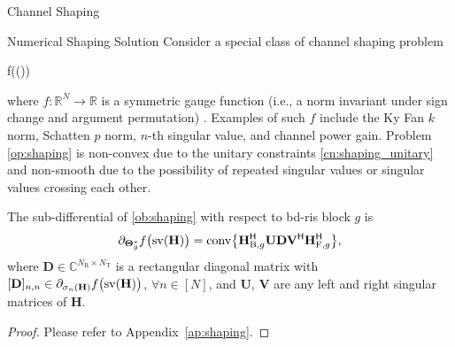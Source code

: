 \documentclass[journal]{IEEEtran}
\begin{document}
\begin{section}{Channel Shaping}
	\begin{subsection}{Numerical Shaping Solution}
		\label{sc:shaping_numerical}
		Consider a special class of channel shaping problem
		\begin{maxi!}
			{\scriptstyle{\mathbf{\Theta}}}{f\bigl(\sv()\bigr)}{\label{op:shaping}}{\label{ob:shaping}}
		\end{maxi!}
		where $f: \mathbb{R}^{N} \to \mathbb{R}$ is a symmetric gauge function (i.e., a norm invariant under sign change and argument permutation) \cite{Watson1992}.
		Examples of such $f$ include the Ky Fan $k$ norm, Schatten $p$ norm, $n$-th singular value, and channel power gain.
		Problem \eqref{op:shaping} is non-convex due to the unitary constraints \eqref{cn:shaping_unitary} and non-smooth due to the possibility of repeated singular values or singular values crossing each other.
		\begin{proposition}
			\label{pp:shaping}
			The sub-differential of \eqref{ob:shaping} with respect to \gls{bd}-\gls{ris} block $g$ is
			\begin{equation}
				\label{eq:shaping_subdiff}
				\partial_{\mathbf{\Theta}_g^*} f\bigl(\operatorname{sv}(\mathbf{H})\bigr) = \operatorname{conv} \bigl\{ \mathbf{H}_{\mathrm{B},g}^\mathsf{H} \mathbf{U} \mathbf{D} \mathbf{V}^\mathsf{H} \mathbf{H}_{\mathrm{F},g}^\mathsf{H} \bigr\},
			\end{equation}
			where $\mathbf{D} \in \mathbb{C}^{N_\mathrm{R} \times N_\mathrm{T}}$ is a rectangular diagonal matrix with $[\mathbf{D}]_{n,n} \in \partial_{\sigma_n(\mathbf{H})} f\bigl(\operatorname{sv}(\mathbf{H})\bigr)$, $\forall n \in [N]$, and $\mathbf{U}$, $\mathbf{V}$ are any left and right singular matrices of $\mathbf{H}$.
		\end{proposition}

		\begin{proof}
			Please refer to Appendix~\ref{ap:shaping}.
		\end{proof}


\end{subsection}
\end{section}
\end{document}
